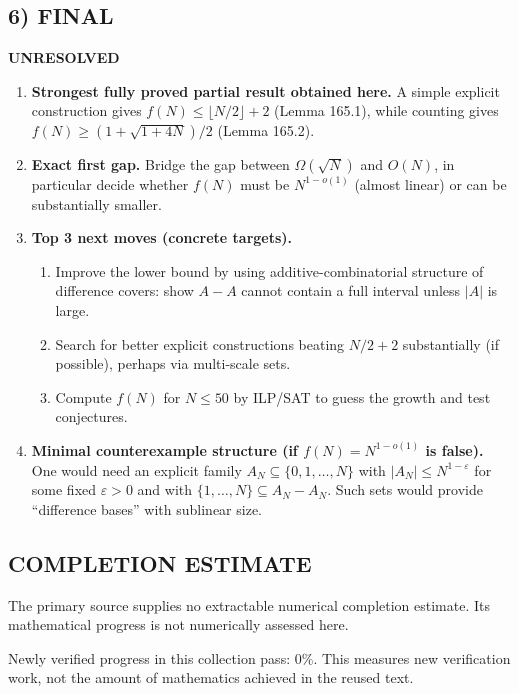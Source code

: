 \subsection*{6) FINAL}
\textbf{UNRESOLVED}

\begin{enumerate}
\item[(i)] \textbf{Strongest fully proved partial result obtained here.}
A simple explicit construction gives $f(N)\le \lfloor N/2\rfloor+2$ (Lemma 165.1), while counting gives $f(N)\ge (1+\sqrt{1+4N})/2$ (Lemma 165.2).

\item[(ii)] \textbf{Exact first gap.}
Bridge the gap between $\Omega(\sqrt N)$ and $O(N)$, in particular decide whether $f(N)$ must be $N^{1-o(1)}$ (almost linear) or can be substantially smaller.

\item[(iii)] \textbf{Top 3 next moves (concrete targets).}
\begin{enumerate}
\item Improve the lower bound by using additive-combinatorial structure of difference covers: show $A-A$ cannot contain a full interval unless $|A|$ is large.
\item Search for better explicit constructions beating $N/2+2$ substantially (if possible), perhaps via multi-scale sets.
\item Compute $f(N)$ for $N\le 50$ by ILP/SAT to guess the growth and test conjectures.
\end{enumerate}

\item[(iv)] \textbf{Minimal counterexample structure (if $f(N)=N^{1-o(1)}$ is false).}
One would need an explicit family $A_N\subseteq\{0,1,\dots,N\}$ with $|A_N|\le N^{1-\varepsilon}$ for some fixed $\varepsilon>0$ and with $\{1,\dots,N\}\subseteq A_N-A_N$. Such sets would provide ``difference bases'' with sublinear size.
\end{enumerate}




\subsection*{COMPLETION ESTIMATE}
The primary source supplies no extractable numerical completion estimate. Its mathematical progress is not numerically assessed here.

Newly verified progress in this collection pass: $0\%$. This measures new verification work, not the amount of mathematics achieved in the reused text.
